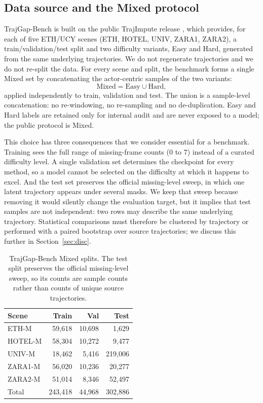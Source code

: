 \subsection{Data source and the Mixed protocol}
\label{sec:mixed}

TrajGap-Bench is built on the public TrajImpute release \cite{chib2024pedestrian}, which provides, for each of five ETH/UCY scenes \cite{lerner2007crowds,pellegrini2009you} (ETH, HOTEL, UNIV, ZARA1, ZARA2), a train/validation/test split and two difficulty variants, Easy and Hard, generated from the same underlying trajectories. We do not regenerate trajectories and we do not re-split the data. For every scene and split, the benchmark forms a single Mixed set by concatenating the actor-centric samples of the two variants:
\begin{equation}
\text{Mixed} = \text{Easy} \cup \text{Hard},
\end{equation}
applied independently to train, validation and test. The union is a sample-level concatenation: no re-windowing, no re-sampling and no de-duplication. Easy and Hard labels are retained only for internal audit and are never exposed to a model; the public protocol is Mixed.

This choice has three consequences that we consider essential for a benchmark. Training sees the full range of missing-frame counts ($0$ to $7$) instead of a curated difficulty level. A single validation set determines the checkpoint for every method, so a model cannot be selected on the difficulty at which it happens to excel. And the test set preserves the official missing-level sweep, in which one latent trajectory appears under several masks. We keep that sweep because removing it would silently change the evaluation target, but it implies that test samples are not independent: two rows may describe the same underlying trajectory. Statistical comparisons must therefore be clustered by trajectory or performed with a paired bootstrap over source trajectories; we discuss this further in Section~\ref{sec:disc}.

\begin{table}[t]
\centering
\small
\caption{TrajGap-Bench Mixed splits. The test split preserves the official missing-level sweep, so its counts are sample counts rather than counts of unique source trajectories.}
\label{tab:data}
\begin{tabular}{@{}lrrr@{}}
\toprule
Scene & Train & Val & Test \\
\midrule
ETH-M   & 59{,}618 & 10{,}698 & 1{,}629 \\
HOTEL-M & 58{,}304 & 10{,}272 & 9{,}477 \\
UNIV-M  & 18{,}462 & 5{,}416  & 219{,}006 \\
ZARA1-M & 56{,}020 & 10{,}236 & 20{,}277 \\
ZARA2-M & 51{,}014 & 8{,}346  & 52{,}497 \\
\midrule
Total   & 243{,}418 & 44{,}968 & 302{,}886 \\
\bottomrule
\end{tabular}
\end{table}

